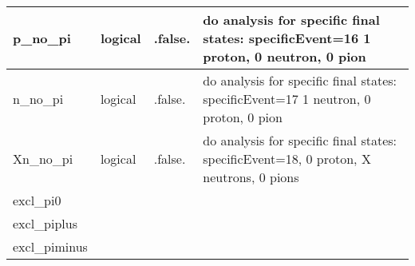 \documentclass{article}
\begin{document}
\begin{longtable}{llll}
\midrule
p\_no\_pi & \begin{minipage}[t]{2cm}logical\end{minipage} & \begin{minipage}[t]{2cm}.false.\end{minipage} & \begin{minipage}[t]{12cm}do analysis for specific final states: specificEvent=16 1 proton, 0 neutron, 0 pion\end{minipage}\\*
\midrule
n\_no\_pi & \begin{minipage}[t]{2cm}logical\end{minipage} & \begin{minipage}[t]{2cm}.false.\end{minipage} & \begin{minipage}[t]{12cm}do analysis for specific final states: specificEvent=17 1 neutron, 0 proton, 0 pion\end{minipage}\\*
\midrule
Xn\_no\_pi & \begin{minipage}[t]{2cm}logical\end{minipage} & \begin{minipage}[t]{2cm}.false.\end{minipage} & \begin{minipage}[t]{12cm}do analysis for specific final states: specificEvent=18, 0 proton, X neutrons, 0 pions\end{minipage}\\*
\midrule
excl\_pi0 & \begin{minipage}[t]{2cm}\end{minipage} & \begin{minipage}[t]{2cm}\end{minipage} & \begin{minipage}[t]{12cm}\end{minipage}\\*
\midrule
excl\_piplus & \begin{minipage}[t]{2cm}\end{minipage} & \begin{minipage}[t]{2cm}\end{minipage} & \begin{minipage}[t]{12cm}\end{minipage}\\*
\midrule
excl\_piminus & \begin{minipage}[t]{2cm}\end{minipage} & \begin{minipage}[t]{2cm}\end{minipage} & \begin{minipage}[t]{12cm}\end{minipage}\\*

\end{longtable}
\end{document}
